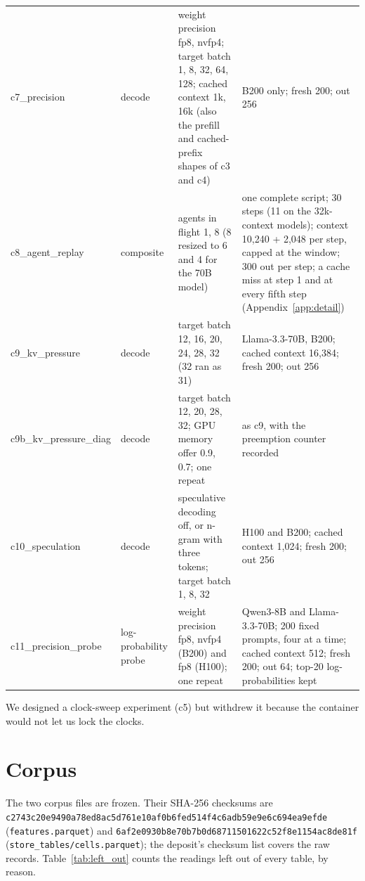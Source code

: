 \documentclass[11pt]{article}
\begin{document}
\begin{table}[h]
\begin{footnotesize}
\begin{tabular}{ll>{\raggedright\arraybackslash}p{5.45cm}>{\raggedright\arraybackslash}p{3.6cm}}
c7\_precision & decode & weight precision fp8, nvfp4; target batch 1, 8, 32, 64, 128; cached context 1k, 16k (also the prefill and cached-prefix shapes of c3 and c4) & B200 only; fresh 200; out 256 \\
c8\_agent\_replay & composite & agents in flight 1, 8 (8 resized to 6 and 4 for the 70B model) & one complete script; 30 steps (11 on the 32k-context models); context 10,240 + 2,048 per step, capped at the window; 300 out per step; a cache miss at step 1 and at every fifth step (Appendix~\ref{app:detail}) \\
c9\_kv\_pressure & decode & target batch 12, 16, 20, 24, 28, 32 (32 ran as 31) & Llama-3.3-70B, B200; cached context 16,384; fresh 200; out 256 \\
c9b\_kv\_pressure\_diag & decode & target batch 12, 20, 28, 32; GPU memory offer 0.9, 0.7; one repeat & as c9, with the preemption counter recorded \\
c10\_speculation & decode & speculative decoding off, or n-gram with three tokens; target batch 1, 8, 32 & H100 and B200; cached context 1,024; fresh 200; out 256 \\
c11\_precision\_probe & log-probability probe & weight precision fp8, nvfp4 (B200) and fp8 (H100); one repeat & Qwen3-8B and Llama-3.3-70B; 200 fixed prompts, four at a time; cached context 512; fresh 200; out 64; top-20 log-probabilities kept \\
\bottomrule
\end{tabular}
\end{footnotesize}
\end{table}

We designed a clock-sweep experiment (c5) but withdrew it because the container would not let us lock the clocks.

\section{Corpus}\label{app:corpus}





\begin{sloppypar}
The two corpus files are frozen. Their SHA-256 checksums are \texttt{c2743c20\allowbreak e9490a78\allowbreak ed8ac5d7\allowbreak 61e10af0\allowbreak b6fed514\allowbreak f4c6adb5\allowbreak 9e9e6c69\allowbreak 4ea9efde} (\texttt{features.parquet}) and \texttt{6af2e093\allowbreak 0b8e70b7\allowbreak b0d68711\allowbreak 501622c5\allowbreak 2f8e1154\allowbreak ac8de81f} (\texttt{store\_tables/cells.parquet}); the deposit's checksum list covers the raw records. Table~\ref{tab:left_out} counts the readings left out of every table, by reason.
\end{sloppypar}
\end{document}
